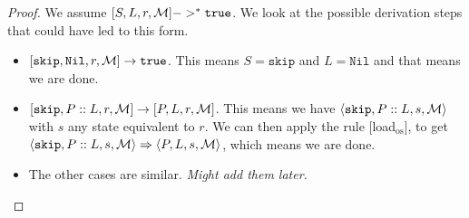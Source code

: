 \begin{proof}
We assume $[ S, L, r, \mathcal{M} ] ->^* \texttt{true}$. We look at the possible derivation steps that could have led to this form. 
\begin{itemize}[noitemsep]
    \item $[ \texttt{skip}, \texttt{Nil}, r, \mathcal{M} ] \to \texttt{true}$. This means $S = \texttt{skip}$ and $L = \texttt{Nil}$ and that means we are done.
    \item $[ \texttt{skip}, P::L, r, \mathcal{M} ] \to [ P, L, r, \mathcal{M} ]$. This means we have $\langle \texttt{skip}, P::L, s, \mathcal{M} \rangle$ with $s$ any state equivalent to $r$. We can then apply the rule [load$_{\textrm{os}}$], to get $\langle \texttt{skip}, P::L, s, \mathcal{M} \rangle \Rightarrow \langle P, L, s, \mathcal{M} \rangle$, which means we are done.
    \item The other cases are similar. \emph{Might add them later.}
\end{itemize}
\end{proof}





